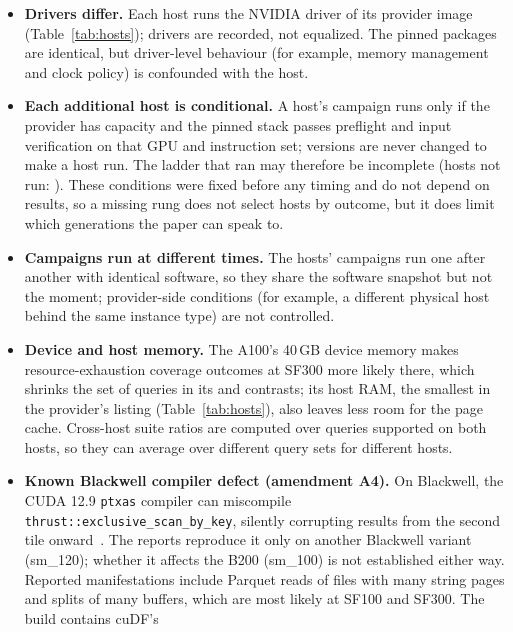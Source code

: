 \documentclass[11pt]{article}
\begin{document}
\begin{itemize}[leftmargin=*,itemsep=2pt]
    the GH200 can come from the CPU side. The platform-specific artifacts are
    recorded with their SHA-256.
  \item \textbf{Drivers differ.} Each host runs the NVIDIA driver of its
    provider image (Table~\ref{tab:hosts}); drivers are recorded, not
    equalized. The pinned packages are identical, but driver-level behaviour
    (for example, memory management and clock policy) is confounded with the
    host.
  \item \textbf{Each additional host is conditional.} A host's campaign runs
    only if the provider has capacity and the pinned stack passes preflight
    and input verification on that GPU and instruction set; versions are never
    changed to make a host run. The ladder that ran may therefore be
    incomplete (hosts not run: ). These conditions
    were fixed before any timing and do not depend on results, so a missing
    rung does not select hosts by outcome, but it does limit which
    generations the paper can speak to.
  \item \textbf{Campaigns run at different times.} The hosts' campaigns run
    one after another with identical software, so they share the software
    snapshot but not the moment; provider-side conditions (for example, a
    different physical host behind the same instance type) are not
    controlled.
  \item \textbf{Device and host memory.} The A100's 40\,GB device memory makes
    resource-exhaustion coverage outcomes at SF300 more likely there, which
    shrinks the set of queries in its \polarsgpu{} and \sparkgpu{} contrasts;
    its host RAM, the smallest in the provider's listing
    (Table~\ref{tab:hosts}), also leaves less room for the page cache.
    Cross-host suite ratios are computed over queries
    supported on both hosts, so they can average over different query sets
    for different hosts.
\ifbtwohundredran
  \item \textbf{Known Blackwell compiler defect (amendment A4).} On
    Blackwell, the CUDA 12.9 \texttt{ptxas} compiler can miscompile
    \texttt{thrust::exclusive\_scan\_by\_key}, silently corrupting results from
    the second tile onward~\citep{cccl11167}. The reports reproduce it only on
    another Blackwell variant (sm\_120); whether it affects the B200 (sm\_100)
    is not established either way. Reported manifestations include Parquet
    reads of files with many string pages and splits of many buffers, which
    are most likely at SF100 and SF300. The \polarsgpu{} build contains cuDF's

\end{itemize}
\end{document}
